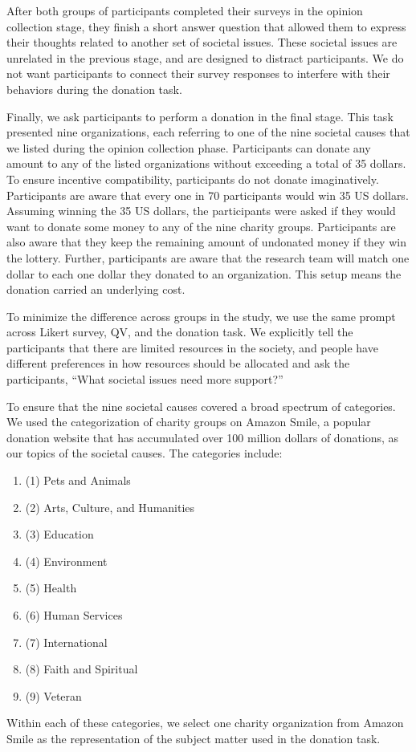 After both groups of participants completed their surveys in the opinion collection stage, 
they finish a short answer question
that allowed them to express their thoughts 
related to another set of societal issues.
These societal issues are unrelated in the previous stage,
and are designed to distract participants.
We do not want participants to connect their survey responses
to interfere with their behaviors during the donation task.

Finally, 
we ask participants to perform a donation in the final stage.
This task presented nine organizations,
each referring to one of the nine societal causes
that we listed during the opinion collection phase.
Participants can donate 
any amount to any of the listed organizations
without exceeding a total of 35 dollars.
To ensure incentive compatibility, 
participants do not donate imaginatively.
Participants are aware that every one in 70 participants would win 35 US dollars.
Assuming winning the 35 US dollars, 
the participants were asked 
if they would want to donate some money 
to any of the nine charity groups.
Participants are also aware that 
they keep the remaining amount of undonated money 
if they win the lottery.
Further, participants are aware that 
the research team will match one dollar to each one dollar 
they donated to an organization.
This setup means the donation carried an underlying cost.

To minimize the difference across groups in the study, 
we use the same prompt across Likert survey, QV, and the donation task.
We explicitly tell the participants that 
there are limited resources in the society, 
and people have different preferences 
in how resources should be allocated and ask the participants, 
``What societal issues need more support?''

To ensure that the nine societal causes 
covered a broad spectrum of categories.
We used the categorization of charity groups on Amazon Smile, 
a popular donation website that has accumulated over 100 million dollars of donations, 
as our topics of the societal causes.
The categories include:
\begin{enumerate}[label={},leftmargin=\parindent]
    \item (1) Pets and Animals
    \item (2) Arts, Culture, and Humanities
    \item (3) Education
    \item (4) Environment
    \item (5) Health
    \item (6) Human Services
    \item (7) International
    \item (8) Faith and Spiritual
    \item (9) Veteran
\end{enumerate}
Within each of these categories, 
we select one charity organization from Amazon Smile 
as the representation of the subject matter used in the donation task.

